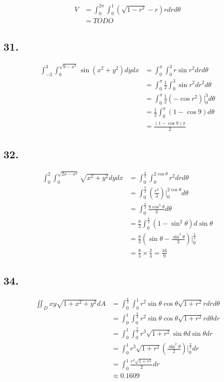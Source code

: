 \documentclass{article}
\begin{document}
  $$\begin{aligned}
    V &= \int_0^{2\pi} \int_0^1 (\sqrt{1-r^2} - r) r dr d\theta \\
    &= TODO
  \end{aligned}$$

  \subsection*{31. }

  $$\begin{aligned}
    \int_{-3}^3 \int_0^{\sqrt{9-x^2}} \sin(x^2+y^2) dy dx &= \int_0^\pi \int_0^3 r\sin r^2 dr d\theta \\
    &= \int_0^{\pi} \frac 1 2 \int_0^3 \sin r^2 dr^2 d\theta \\
    &= \int_0^{\pi} \frac 1 2 (-\cos r^2)\biggl|_0^3 d\theta \\
    &= \frac 1 2 \int_0^{\pi} (1 -\cos 9) d\theta \\
    &= \frac{(1-\cos 9)\pi}{2}
  \end{aligned}$$

  \subsection*{32. }

  $$\begin{aligned}
    \int_0^2 \int_0^{\sqrt{2x-x^2}} \sqrt{x^2+y^2} dy dx &= \int_0^{\frac \pi 2} \int_0^{2\cos \theta} r^2 dr d\theta \\
    &= \int_0^{\frac \pi 2} (\frac{r^3}{3})\biggl|_{0}^{2\cos \theta} d\theta \\
    &= \int_0^{\frac \pi 2} \frac{8\cos^3 \theta}{3} d\theta \\
    &= \frac 8 3 \int_0^{\frac \pi 2} (1-\sin^2 \theta) d \sin \theta \\
    &= \frac 8 3 (\sin \theta - \frac{\sin^3 \theta}{3})\biggl|_0^{\frac \pi 2} \\
    &= \frac 8 3 \times \frac 2 3 = \frac{16}{9}
  \end{aligned}$$

  \subsection*{34. }

  $$\begin{aligned}
    \iint_D xy \sqrt{1 + x^2 + y^2} dA &= \int_0^{\frac \pi 2} \int_0^1 r^2 \sin \theta \cos \theta \sqrt{1 + r^2} r dr d\theta \\ 
    &= \int_0^1 \int_0^{\frac \pi 2} r^2 \sin \theta \cos \theta \sqrt{1 + r^2} r  d\theta dr \\
    &= \int_0^1 \int_0^{\frac \pi 2} r^3 \sqrt{1+r^2} \sin \theta d \sin \theta dr \\
    &= \int_0^1 r^3 \sqrt{1+r^2}(\frac{\sin^2 \theta}{2})\biggl|_{0}^{\frac \pi 2} dr \\
    &= \int_0^1 \frac{r^3\sqrt{1+r^2}}{2} dr \\
    &\approx 0.1609
  \end{aligned}$$
\end{document}
